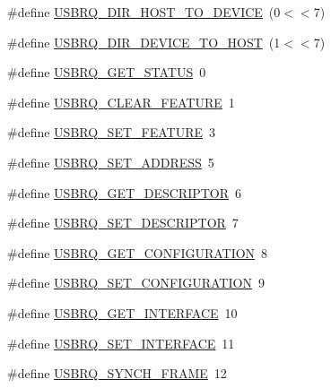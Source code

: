 \begin{DoxyCompactItemize}
\#define \hyperlink{mhvlib-_vusb-_console_2vusb_2usbdrv_8h_aa187b3efe1a0ef577e6f695a47608bef}{U\-S\-B\-R\-Q\-\_\-\-D\-I\-R\-\_\-\-H\-O\-S\-T\-\_\-\-T\-O\-\_\-\-D\-E\-V\-I\-C\-E}~(0$<$$<$7)
\item 
\#define \hyperlink{mhvlib-_vusb-_console_2vusb_2usbdrv_8h_a04a0c4970f7371115638586bc8a14325}{U\-S\-B\-R\-Q\-\_\-\-D\-I\-R\-\_\-\-D\-E\-V\-I\-C\-E\-\_\-\-T\-O\-\_\-\-H\-O\-S\-T}~(1$<$$<$7)
\item 
\#define \hyperlink{mhvlib-_vusb-_console_2vusb_2usbdrv_8h_a523252bd739d1b14018ec34e49466d72}{U\-S\-B\-R\-Q\-\_\-\-G\-E\-T\-\_\-\-S\-T\-A\-T\-U\-S}~0
\item 
\#define \hyperlink{mhvlib-_vusb-_console_2vusb_2usbdrv_8h_a82766d6fb4294e1cb5f7cb2086e81715}{U\-S\-B\-R\-Q\-\_\-\-C\-L\-E\-A\-R\-\_\-\-F\-E\-A\-T\-U\-R\-E}~1
\item 
\#define \hyperlink{mhvlib-_vusb-_console_2vusb_2usbdrv_8h_a1802461b0f91708022a66f407fadd1f1}{U\-S\-B\-R\-Q\-\_\-\-S\-E\-T\-\_\-\-F\-E\-A\-T\-U\-R\-E}~3
\item 
\#define \hyperlink{mhvlib-_vusb-_console_2vusb_2usbdrv_8h_a6837bf1e17c56a25b97db0be68b03519}{U\-S\-B\-R\-Q\-\_\-\-S\-E\-T\-\_\-\-A\-D\-D\-R\-E\-S\-S}~5
\item 
\#define \hyperlink{mhvlib-_vusb-_console_2vusb_2usbdrv_8h_a225b041572762941a96694d5498e853e}{U\-S\-B\-R\-Q\-\_\-\-G\-E\-T\-\_\-\-D\-E\-S\-C\-R\-I\-P\-T\-O\-R}~6
\item 
\#define \hyperlink{mhvlib-_vusb-_console_2vusb_2usbdrv_8h_a2fb2a12d1a7d37bce6bcf535f48ade9e}{U\-S\-B\-R\-Q\-\_\-\-S\-E\-T\-\_\-\-D\-E\-S\-C\-R\-I\-P\-T\-O\-R}~7
\item 
\#define \hyperlink{mhvlib-_vusb-_console_2vusb_2usbdrv_8h_a16d2228bcfa8944c18a39df43016cea5}{U\-S\-B\-R\-Q\-\_\-\-G\-E\-T\-\_\-\-C\-O\-N\-F\-I\-G\-U\-R\-A\-T\-I\-O\-N}~8
\item 
\#define \hyperlink{mhvlib-_vusb-_console_2vusb_2usbdrv_8h_afc6adbbfd47da950ccf50277a41bfe58}{U\-S\-B\-R\-Q\-\_\-\-S\-E\-T\-\_\-\-C\-O\-N\-F\-I\-G\-U\-R\-A\-T\-I\-O\-N}~9
\item 
\#define \hyperlink{mhvlib-_vusb-_console_2vusb_2usbdrv_8h_a44a94b5f45d9ffb957b9590eea8a73a4}{U\-S\-B\-R\-Q\-\_\-\-G\-E\-T\-\_\-\-I\-N\-T\-E\-R\-F\-A\-C\-E}~10
\item 
\#define \hyperlink{mhvlib-_vusb-_console_2vusb_2usbdrv_8h_a904cc1bbdd859501d590ce47099a49ec}{U\-S\-B\-R\-Q\-\_\-\-S\-E\-T\-\_\-\-I\-N\-T\-E\-R\-F\-A\-C\-E}~11
\item 
\#define \hyperlink{mhvlib-_vusb-_console_2vusb_2usbdrv_8h_ac4b47c9502650f6a74714f852825746c}{U\-S\-B\-R\-Q\-\_\-\-S\-Y\-N\-C\-H\-\_\-\-F\-R\-A\-M\-E}~12

\end{DoxyCompactItemize}
